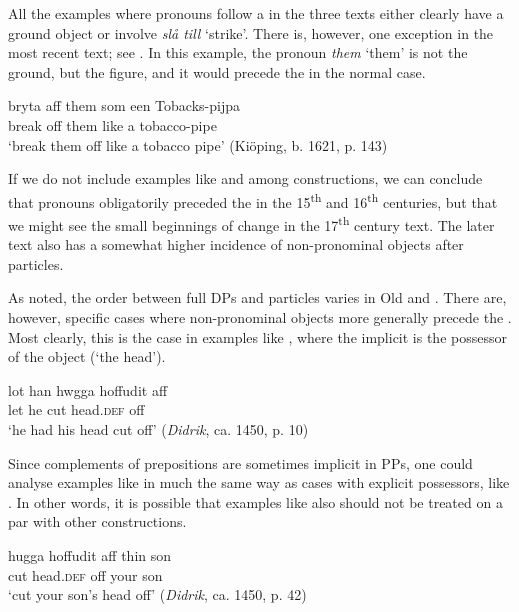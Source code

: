 \documentclass[output=paper]{langscibook}
\begin{document}
All the examples where pronouns follow a  in the three texts either clearly have a ground object or involve \textit{slå till} ‘strike’. There is, however, one exception in the most recent text; see . In this example, the pronoun \textit{them} ‘them’ is not the ground, but the figure, and it would precede the  in the normal case.


\ea\label{ex:lalu:29}
\gll  bryta     aff   them   som   een     Tobacks-pijpa\\
break   off   them   like     a     tobacco-pipe\\
\glt `break them off like a tobacco pipe’ (Kiöping, b. 1621, p. 143)\\
\z


If we do not include examples like  and  among  constructions, we can conclude that pronouns obligatorily preceded the  in the 15\textsuperscript{th} and 16\textsuperscript{th} centuries, but that we might see the small beginnings of change in the 17\textsuperscript{th} century text. The later text also has a somewhat higher incidence of non-pronominal objects after particles.



As noted, the order between full DPs and particles varies in Old and . There are, however, specific cases where non-pronominal objects more generally precede the . Most clearly, this is the case in examples like , where the implicit  is the possessor of the object (‘the head’).


\ea\label{ex:lalu:30}
\gll  lot    han   hwgga   hoffudit aff\\
let    he   cut     head.\textsc{def}   off \\
\glt `he had his head cut off’ (\textit{Didrik}, ca. 1450, p. 10)\\
\z


Since complements of prepositions are sometimes implicit in  PPs, one could analyse examples like  in much the same way as cases with explicit possessors, like . In other words, it is possible that examples like  also should not be treated on a par with other  constructions.


\ea\label{ex:lalu:31}
\gll  hugga   hoffudit       aff     thin     son\\
cut         head.\textsc{def}   off   your   son\\
\glt `cut your son’s head off’ (\textit{Didrik}, ca. 1450, p. 42)\\
\z
\end{document}
